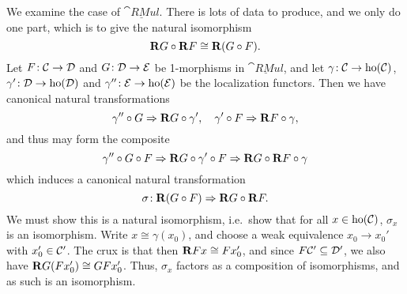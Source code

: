 \begin{proofsketch}
We examine the case of \(\underline{\cat{RMul}}\). There is lots of data to produce, and we only do one part, which is to give the natural isomorphism
\[ \mathbf{R} G\circ \mathbf{R} F \cong \mathbf{R}(G\circ F). \]
Let \(F\!:\mathcal{C}\to\mathcal{D}\) and \(G\!:\mathcal{D}\to\mathcal{E}\) be 1-morphisms in \(\underline{\cat{RMul}}\), and let \(\gamma\!:\mathcal{C}\to\operatorname{ho}(\mathcal{C})\), \(\gamma'\!:\mathcal{D}\to\operatorname{ho}(\mathcal{D})\) and \(\gamma''\!:\mathcal{E}\to\operatorname{ho}(\mathcal{E})\)
be the localization functors. Then we have canonical natural transformations
\[ \gamma''\circ G\Rightarrow \mathbf{R} G \circ \gamma',\quad \gamma'\circ F\Rightarrow \mathbf{R} F\circ \gamma, \]
and thus may form the composite
\[ \gamma''\circ G\circ F \Rightarrow \mathbf{R} G\circ\gamma'\circ F \Rightarrow \mathbf{R} G\circ \mathbf{R} F\circ \gamma \]
which induces a canonical natural transformation
\[ \sigma\!: \mathbf{R}(G\circ F)\Rightarrow\mathbf{R} G\circ\mathbf{R} F. \]
We must show this is a natural isomorphism, i.e.\ show that for all \(x\in\operatorname{ho}(\mathcal{C})\), \(\sigma_x\) is an isomorphism. Write \(x\cong \gamma(x_0)\), and choose a weak equivalence \(x_0\to x_0'\)
with \(x_0'\in\mathcal{C}'\). The crux is that then \(\mathbf{R} Fx \cong Fx_0'\), and since \(F\mathcal{C}'\subseteq\mathcal{D}'\), we also have \(\mathbf{R} G(Fx_0') \cong GFx_0' \). Thus, \(\sigma_x\) factors
as a composition of isomorphisms, and as such is an isomorphism.
\end{proofsketch}


